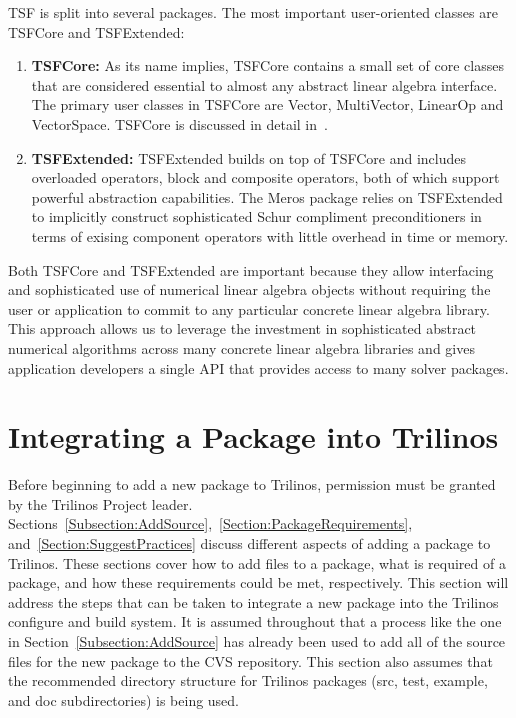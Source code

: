 \documentclass[12pt,relax]{TrilinosDevGuide}
\begin{document}
TSF is split into several packages.  The most important user-oriented
classes are TSFCore and TSFExtended:
\begin{enumerate}
\item {\bf TSFCore:} As its name implies, TSFCore contains a small set
of core classes that are considered essential to almost any abstract
linear algebra interface.  The primary user classes in TSFCore are
Vector, MultiVector, LinearOp and VectorSpace. TSFCore is discussed in
detail in~\cite{TSFCore}.
\item {\bf TSFExtended:} TSFExtended builds on top of TSFCore and
includes overloaded operators, block and composite operators, both of
which support powerful abstraction capabilities.  The Meros package
relies on TSFExtended to implicitly construct sophisticated
Schur compliment preconditioners in terms of exising component
operators with little overhead in time or memory.
\end{enumerate}

Both TSFCore and TSFExtended are important because they allow
interfacing and sophisticated use of numerical linear algebra objects
without requiring the user or application to commit to any particular
concrete linear algebra library.  This approach allows us to leverage
the investment in sophisticated abstract numerical algorithms across
many concrete linear algebra libraries and gives application
developers a single API that provides access to many solver packages.


\section{Integrating a Package into Trilinos}
\label{Section:IntegratingPackages}
Before beginning to add a new package to Trilinos, permission must be 
granted by the Trilinos Project leader.  
Sections~\ref{Subsection:AddSource},~\ref{Section:PackageRequirements}, 
and~\ref{Section:SuggestPractices} discuss different aspects of adding a 
package to Trilinos.  These sections cover how to add files to a package,
what is required of a package, and how these requirements could be met, 
respectively.  This section will address the steps that can be taken to 
integrate a new package into the Trilinos configure and build system.  It is 
assumed throughout that a process like the one in 
Section~\ref{Subsection:AddSource} has already been used to add all of the 
source files for the new package to the CVS repository.  This section also 
assumes that the recommended directory structure for Trilinos packages 
(src, test, example, and doc subdirectories) is being used.
\end{document}
